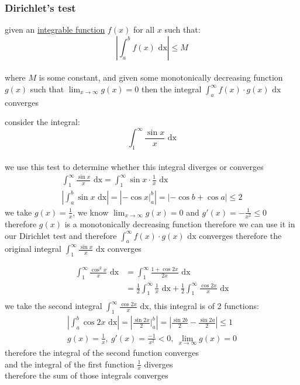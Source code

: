 \documentclass[a4paper,12pt]{article}
\newcommand{\?}{\stackrel{?}{=}}
\begin{document}
\subsubsection{Dirichlet's test}
\label{sec:org6f3d3ae}
\begin{definition}
given an \hyperref[sec:org53be8a4]{integrable function} \(f(x)\) for all \(x\) such that:\\[0pt]
\[
  \left|\int_a^b f(x) \text{ dx}\right| \leq M
\]\\[0pt]
where \(M\) is some constant, and given some monotonically decreasing function \(g(x)\) such that \(\lim_{x\to\infty} g(x) = 0\) then the integral \(\int_a^\infty f(x) \cdot g(x) \text{ dx}\) converges\\[0pt]
\begin{my_example}
consider the integral:\\[0pt]
\[
  \int_1^\infty \frac{\sin x}{x} \text{ dx}
\]\\[0pt]
we use this test to determine whether this integral diverges or converges\\[0pt]
\begin{gather*}
  \int_1^\infty \frac{\sin x}{x} \text{ dx} = \int_1^\infty \sin x \cdot \frac1x \text{ dx}\\
  \left|\int_a^b \sin x \text{ dx}\right| = \left|-\cos x\big|_a^b\right| = |-\cos b + \cos a| \leq 2
\end{gather*}
we take \(g(x) = \frac1x\), we know \(\lim_{x\to\infty} g(x) = 0\) and \(g'(x)=-\frac1{x^2} \leq 0\) therefore \(g(x)\) is a monotonically decreasing function therefore we can use it in our Dirichlet test and therefore \(\int_a^\infty f(x) \cdot g(x) \text{ dx}\) converges therefore the original integral \(\int_1^\infty \frac{\sin x}{x} \text{ dx}\) converges\\[0pt]
\end{my_example}

\begin{my_example}
\begin{align*}
  \int_1^\infty \frac{\cos^2 x}{x} \text{ dx} &= \int_1^\infty \frac{1+\cos 2x}{2x} \text{ dx}\\
  &= \frac12\int_1^\infty \frac{1}{x} \text{ dx} + \frac12\int_1^\infty \frac{\cos 2x}{x} \text{ dx}\\
\end{align*}
we take the second integral \(\int_1^\infty \frac{\cos 2x}{x} \text{ dx}\), this integral is of 2 functions:\\[0pt]
\begin{gather*}
  \left|\int_a^b \cos 2x \text{ dx}\right| = \left|\frac{\sin 2x}{2}\Bigg|_a^b\right| = \left|\frac{\sin 2b}{2} - \frac{\sin 2a}{2}\right| \leq 1\\
  g(x) = \frac1x,\ g'(x) = \frac{-1}{x^2} < 0,\ \lim_{x\to\infty} g(x) = 0
\end{gather*}
therefore the integral of the second function converges\\[0pt]
and the integral of the first function \(\frac1x\) diverges\\[0pt]
therefore the sum of those integrals converges\\[0pt]
\end{my_example}


\end{definition}
\end{document}

